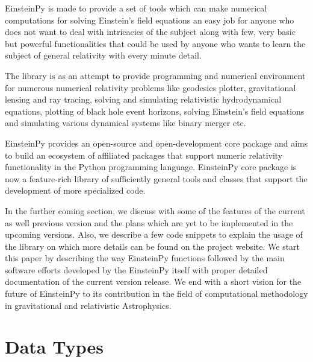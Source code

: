 \documentclass[onecolumn]{aa}
\begin{document}
   EinsteinPy is made to provide a set of tools which can make numerical 
   computations for solving Einstein’s field equations an easy job for anyone 
   who does not want to deal with intricacies of the subject along with few, 
   very basic but powerful functionalities that could be used by anyone who 
   wants to learn the subject of general relativity with every minute detail.
   
   The library is as an attempt to provide programming and numerical environment 
   for numerous numerical relativity problems like geodesics plotter, gravitational 
   lensing and ray tracing, solving and simulating relativistic hydrodynamical  
   equations, plotting of black hole event horizons, solving Einstein’s 
   field equations and simulating various dynamical systems like binary merger etc.
   
   EinsteinPy provides an open-source and open-development core package and 
   aims to build an ecosystem of affiliated packages that support numeric 
   relativity functionality in the Python programming language. EinsteinPy 
   core package is now a feature-rich library of sufficiently general tools 
   and classes that support the development of more specialized code.
   
   In the further coming section, we discuss with some of the features of the 
   current as well previous version and the plans which are yet to be implemented 
   in the upcoming versions. Also, we describe a few code snippets to explain 
   the usage of the library on which more details can be found on the 
   project website. We start this paper by describing the way EinsteinPy functions 
   followed by the main software efforts developed by the EinsteinPy itself 
   with proper detailed documentation of the current version release. We end 
   with a short vision for the future of EinsteinPy to its contribution in 
   the field of computational methodology in gravitational and 
   relativistic Astrophysics.

\section{Data Types}
\end{document}
